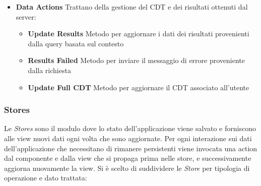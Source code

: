 \begin{itemize}
\begin{itemize}
	\end{itemize}
	\item \textbf{Data Actions}
	Trattano della gestione del CDT e dei risultati ottenuti dal server:
	\begin{itemize}
		\item \textbf{Update Results}
		Metodo per aggiornare i dati dei risultati provenienti dalla query basata sul contesto
		\item \textbf{Results Failed}
		Metodo per inviare il messaggio di errore proveniente dalla richiesta
		\item \textbf{Update Full CDT}
		Metodo per aggiornare il CDT associato all'utente
	\end{itemize}
\end{itemize}

\subsubsection{Stores\label{sec:action-store}}

Le \emph{Stores} sono il modulo dove lo stato dell'applicazione viene salvato e forniscono alle view nuovi dati ogni volta che sono aggiornate. 
Per ogni interazione sui dati dell'applicazione che necessitano di rimanere persistenti viene invocata una action dal componente e dalla view che si propaga prima nelle store, e successivamente aggiorna nuovamente la view.
Si è scelto di suddividere le \emph{Store} per tipologia di operazione e dato trattata:

